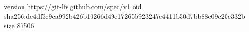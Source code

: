 version https://git-lfs.github.com/spec/v1
oid sha256:de4df3c9ca992b426b10266d49e17265b923247c4411b50d7bb88e09c20c332b
size 87506
